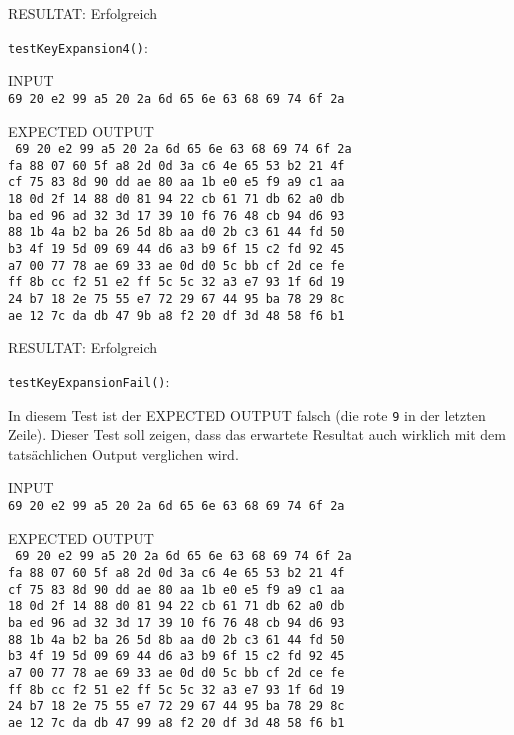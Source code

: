 \documentclass[12pt, letterpaper]{article}
\newcommand{\code}[1]{\texttt{#1}}
\begin{document}
RESULTAT: {\color{dgreen}Erfolgreich}

\newpage
\code{testKeyExpansion4()}:

INPUT\\
\code{69 20 e2 99 a5 20 2a 6d 65 6e 63 68 69 74 6f 2a}

EXPECTED OUTPUT\\
\code{
69 20 e2 99 a5 20 2a 6d 65 6e 63 68 69 74 6f 2a\\
fa 88 07 60 5f a8 2d 0d 3a c6 4e 65 53 b2 21 4f\\
cf 75 83 8d 90 dd ae 80 aa 1b e0 e5 f9 a9 c1 aa\\
18 0d 2f 14 88 d0 81 94 22 cb 61 71 db 62 a0 db\\
ba ed 96 ad 32 3d 17 39 10 f6 76 48 cb 94 d6 93\\
88 1b 4a b2 ba 26 5d 8b aa d0 2b c3 61 44 fd 50\\
b3 4f 19 5d 09 69 44 d6 a3 b9 6f 15 c2 fd 92 45\\
a7 00 77 78 ae 69 33 ae 0d d0 5c bb cf 2d ce fe\\
ff 8b cc f2 51 e2 ff 5c 5c 32 a3 e7 93 1f 6d 19\\
24 b7 18 2e 75 55 e7 72 29 67 44 95 ba 78 29 8c\\
ae 12 7c da db 47 9b a8 f2 20 df 3d 48 58 f6 b1
}

RESULTAT: {\color{dgreen}Erfolgreich}

\code{testKeyExpansionFail()}:

In diesem Test ist der EXPECTED OUTPUT falsch (die rote \code{{\color{red}9}} in der letzten Zeile). Dieser Test soll zeigen, dass das erwartete Resultat auch wirklich mit dem tatsächlichen Output verglichen wird.

INPUT\\
\code{69 20 e2 99 a5 20 2a 6d 65 6e 63 68 69 74 6f 2a}

EXPECTED OUTPUT\\
\code{
69 20 e2 99 a5 20 2a 6d 65 6e 63 68 69 74 6f 2a\\
fa 88 07 60 5f a8 2d 0d 3a c6 4e 65 53 b2 21 4f\\
cf 75 83 8d 90 dd ae 80 aa 1b e0 e5 f9 a9 c1 aa\\
18 0d 2f 14 88 d0 81 94 22 cb 61 71 db 62 a0 db\\
ba ed 96 ad 32 3d 17 39 10 f6 76 48 cb 94 d6 93\\
88 1b 4a b2 ba 26 5d 8b aa d0 2b c3 61 44 fd 50\\
b3 4f 19 5d 09 69 44 d6 a3 b9 6f 15 c2 fd 92 45\\
a7 00 77 78 ae 69 33 ae 0d d0 5c bb cf 2d ce fe\\
ff 8b cc f2 51 e2 ff 5c 5c 32 a3 e7 93 1f 6d 19\\
24 b7 18 2e 75 55 e7 72 29 67 44 95 ba 78 29 8c\\
ae 12 7c da db 47 9{\color{red}9} a8 f2 20 df 3d 48 58 f6 b1
}
\end{document}
